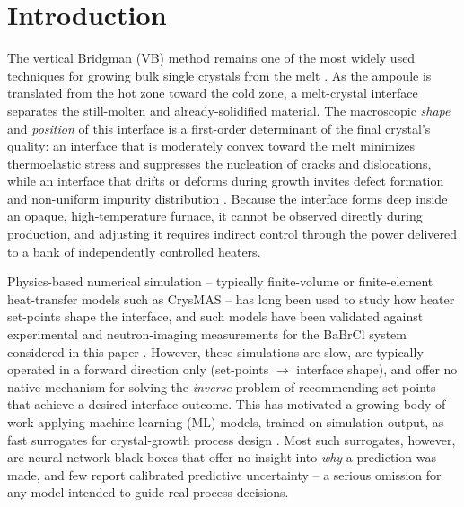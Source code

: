 \documentclass[conference]{IEEEtran}
\begin{document}
\section{Introduction}
The vertical Bridgman (VB) method remains one of the most widely used techniques for growing bulk single crystals from the melt \cite{bridgman}. As the ampoule is translated from the hot zone toward the cold zone, a melt-crystal interface separates the still-molten and already-solidified material. The macroscopic \emph{shape} and \emph{position} of this interface is a first-order determinant of the final crystal's quality: an interface that is moderately convex toward the melt minimizes thermoelastic stress and suppresses the nucleation of cracks and dislocations, while an interface that drifts or deforms during growth invites defect formation and non-uniform impurity distribution \cite{zhang_cheng2022}. Because the interface forms deep inside an opaque, high-temperature furnace, it cannot be observed directly during production, and adjusting it requires indirect control through the power delivered to a bank of independently controlled heaters.

Physics-based numerical simulation -- typically finite-volume or finite-element heat-transfer models such as CrysMAS -- has long been used to study how heater set-points shape the interface, and such models have been validated against experimental and neutron-imaging measurements for the BaBrCl system considered in this paper \cite{derby_neutron}. However, these simulations are slow, are typically operated in a forward direction only (set-points $\rightarrow$ interface shape), and offer no native mechanism for solving the \emph{inverse} problem of recommending set-points that achieve a desired interface outcome. This has motivated a growing body of work applying machine learning (ML) models, trained on simulation output, as fast surrogates for crystal-growth process design \cite{dropka_review}. Most such surrogates, however, are neural-network black boxes that offer no insight into \emph{why} a prediction was made, and few report calibrated predictive uncertainty -- a serious omission for any model intended to guide real process decisions.
\end{document}
